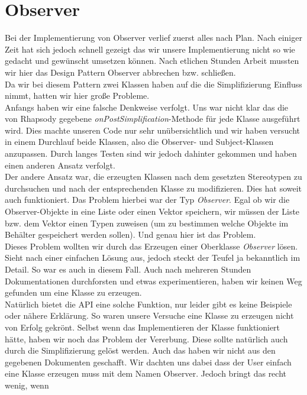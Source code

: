 \section{Observer}
Bei der Implementierung von Observer verlief zuerst alles nach Plan. Nach einiger
Zeit hat sich jedoch schnell gezeigt das wir unsere Implementierung nicht so wie
gedacht und gewünscht umsetzen können. Nach etlichen Stunden Arbeit mussten wir
hier das Design Pattern Observer abbrechen bzw. schließen.\\
Da wir bei diesem Pattern zwei Klassen haben auf die die Simplifizierung
Einfluss nimmt, hatten wir hier große Probleme.\\
Anfangs haben wir eine falsche Denkweise verfolgt. Uns war nicht klar das die
von Rhapsody gegebene \textit{onPostSimplification}-Methode für jede Klasse ausgeführt
wird.
Dies machte unseren Code nur sehr unübersichtlich und wir haben versucht in einem Durchlauf
beide Klassen, also die Observer- und Subject-Klassen
anzupassen. Durch langes Testen sind wir jedoch dahinter gekommen und haben
einen anderen Ansatz verfolgt.\\
Der andere Ansatz war, die erzeugten Klassen nach dem
gesetzten Stereotypen zu durchsuchen und nach der entsprechenden Klasse zu modifizieren.
Dies hat soweit auch funktioniert. Das Problem hierbei war der Typ \textit{Observer}. Egal ob
wir die Observer-Objekte in eine Liste oder einen Vektor speichern, wir müssen der 
Liste bzw. dem Vektor einen Typen zuweisen (um zu bestimmen welche Objekte im Behälter
gespeichert werden sollen). Und genau hier ist das Problem.\\
Dieses Problem wollten wir durch das Erzeugen einer Oberklasse \textit{Observer} lösen.
Sieht nach einer einfachen Lösung aus, jedoch steckt der Teufel ja bekanntlich
im Detail. So war es auch in diesem Fall. Auch nach mehreren Stunden
Dokumentationen durchforsten und etwas experimentieren, haben wir keinen Weg
gefunden um eine Klasse zu erzeugen.\\
Natürlich bietet die API eine solche Funktion, nur leider gibt es keine Beispiele
oder nähere Erklärung. So waren unsere Versuche eine Klasse zu erzeugen nicht
von Erfolg gekrönt. Selbst wenn das Implementieren der Klasse funktioniert
hätte, haben wir noch das Problem der Vererbung. Diese sollte natürlich auch
durch die Simplifizierung gelöst werden. Auch das haben wir nicht aus den
gegebenen Dokumenten geschafft. Wir dachten uns dabei dass der User einfach eine
Klasse erzeugen muss mit dem Namen Observer. Jedoch bringt das recht wenig, wenn
